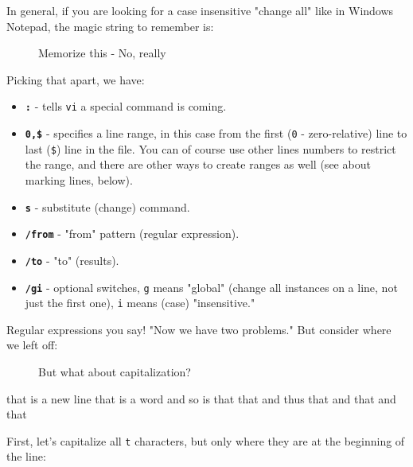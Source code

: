 \documentclass[10pt,american,]{book}
\newenvironment{Shaded}{\begin{snugshade}}{\end{snugshade}}
\newcommand{\KeywordTok}[1]{\textcolor[rgb]{0.13,0.29,0.53}{\textbf{{#1}}}}
\newcommand{\OtherTok}[1]{\textcolor[rgb]{0.56,0.35,0.01}{{#1}}}
\newcommand{\NormalTok}[1]{{#1}}
\numberwithin{figure}{chapter}
\DeclareRobustCommand{\drcap}[1]{\begin{figure}[H]\caption{#1}\end{figure}}
\renewcommand{\KeywordTok}[1]{{#1}}
\renewcommand{\OtherTok}[1]{{#1}}
\renewcommand{\NormalTok}[1]{{#1}}
\begin{document}
In general, if you are looking for a case insensitive "change all" like
in Windows Notepad, the magic string to remember is:

\drcap{Memorize this - No, really}

\begin{Shaded}
\end{Shaded}

Picking that apart, we have:

\begin{itemize}
\item
  \textbf{\texttt{:}} - tells \texttt{vi} a special command is coming.
\item
  \textbf{\texttt{0,\$}} - specifies a line range, in this case from the
  first (\texttt{0} - zero-relative) line to last (\texttt{\$}) line in
  the file. You can of course use other lines numbers to restrict the
  range, and there are other ways to create ranges as well (see about
  marking lines, below).
\item
  \textbf{\texttt{s}} - substitute (change) command.
\item
  \textbf{\texttt{/from}} - "from" pattern (regular expression).
\item
  \textbf{\texttt{/to}} - "to" (results).
\item
  \textbf{\texttt{/gi}} - optional switches, \texttt{g} means "global"
  (change all instances on a line, not just the first one), \texttt{i}
  means (case) "insensitive."
\end{itemize}

Regular expressions you say! "Now we have two
problems." But consider where we left off:

\drcap{But what about capitalization?}

\begin{Shaded}
\begin{Highlighting}[]
\KeywordTok{that} \NormalTok{is a new line}
\KeywordTok{that} \NormalTok{is a word}
\KeywordTok{and} \NormalTok{so is that}
\KeywordTok{that} \NormalTok{and thus}
\KeywordTok{that} \NormalTok{and that and that}
\end{Highlighting}
\end{Shaded}

First, let's capitalize all \texttt{t} characters, but only where they
are at the beginning of the line:
\end{document}
